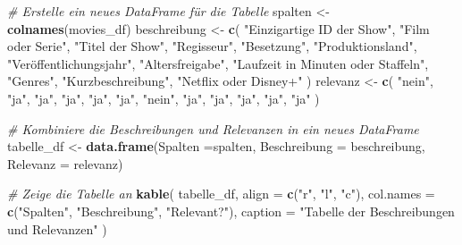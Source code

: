 \documentclass[
]{article}
\newenvironment{Shaded}{\begin{snugshade}}{\end{snugshade}}
\newcommand{\AttributeTok}[1]{\textcolor[rgb]{0.13,0.29,0.53}{#1}}
\newcommand{\CommentTok}[1]{\textcolor[rgb]{0.56,0.35,0.01}{\textit{#1}}}
\newcommand{\FunctionTok}[1]{\textcolor[rgb]{0.13,0.29,0.53}{\textbf{#1}}}
\newcommand{\NormalTok}[1]{#1}
\newcommand{\OtherTok}[1]{\textcolor[rgb]{0.56,0.35,0.01}{#1}}
\newcommand{\StringTok}[1]{\textcolor[rgb]{0.31,0.60,0.02}{#1}}
\begin{document}
\begin{Shaded}
\begin{Highlighting}[]
\CommentTok{\# Erstelle ein neues DataFrame für die Tabelle}
\NormalTok{spalten }\OtherTok{\textless{}{-}} \FunctionTok{colnames}\NormalTok{(movies\_df)}
\NormalTok{beschreibung }\OtherTok{\textless{}{-}} \FunctionTok{c}\NormalTok{(}
    \StringTok{"Einzigartige ID der Show"}\NormalTok{, }
    \StringTok{"Film oder Serie"}\NormalTok{, }
    \StringTok{"Titel der Show"}\NormalTok{, }
    \StringTok{"Regisseur"}\NormalTok{, }
    \StringTok{"Besetzung"}\NormalTok{,}
    \StringTok{"Produktionsland"}\NormalTok{,}
    \StringTok{"Veröffentlichungsjahr"}\NormalTok{,}
    \StringTok{"Altersfreigabe"}\NormalTok{,}
    \StringTok{"Laufzeit in Minuten oder Staffeln"}\NormalTok{,}
    \StringTok{"Genres"}\NormalTok{,}
    \StringTok{"Kurzbeschreibung"}\NormalTok{,}
    \StringTok{"Netflix oder Disney+"}
\NormalTok{)}
\NormalTok{relevanz }\OtherTok{\textless{}{-}} \FunctionTok{c}\NormalTok{(}
    \StringTok{"nein"}\NormalTok{,}
    \StringTok{"ja"}\NormalTok{,}
    \StringTok{"ja"}\NormalTok{,}
    \StringTok{"ja"}\NormalTok{,}
    \StringTok{"ja"}\NormalTok{,}
    \StringTok{"ja"}\NormalTok{,}
    \StringTok{"nein"}\NormalTok{,}
    \StringTok{"ja"}\NormalTok{,}
    \StringTok{"ja"}\NormalTok{,}
    \StringTok{"ja"}\NormalTok{,}
    \StringTok{"ja"}\NormalTok{,}
    \StringTok{"ja"}
\NormalTok{)}

\CommentTok{\# Kombiniere die Beschreibungen und Relevanzen in ein neues DataFrame}
\NormalTok{tabelle\_df }\OtherTok{\textless{}{-}} \FunctionTok{data.frame}\NormalTok{(}\AttributeTok{Spalten =}\NormalTok{spalten, }\AttributeTok{Beschreibung =}\NormalTok{ beschreibung, }\AttributeTok{Relevanz =}\NormalTok{ relevanz)}

\CommentTok{\# Zeige die Tabelle an}
\FunctionTok{kable}\NormalTok{(}
\NormalTok{  tabelle\_df,}
  \AttributeTok{align =} \FunctionTok{c}\NormalTok{(}\StringTok{"r"}\NormalTok{, }\StringTok{"l"}\NormalTok{, }\StringTok{"c"}\NormalTok{),}
  \AttributeTok{col.names =} \FunctionTok{c}\NormalTok{(}\StringTok{"Spalten"}\NormalTok{, }\StringTok{"Beschreibung"}\NormalTok{, }\StringTok{"Relevant?"}\NormalTok{),}
  \AttributeTok{caption =} \StringTok{"Tabelle der Beschreibungen und Relevanzen"}
\NormalTok{)}
\end{Highlighting}
\end{Shaded}
\end{document}
